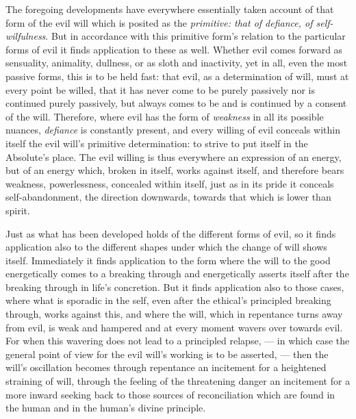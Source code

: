 \documentclass[12pt,a4paper]{book}
\begin{document}
The foregoing developments have everywhere essentially taken account of that
form of the evil will which is posited as the \emph{primitive: that of defiance,
of self-wilfulness}. But in accordance with this primitive form's relation to
the particular forms of evil it finds application to these as well. Whether evil
comes forward as sensuality, animality, dullness, or as sloth and inactivity,
yet in all, even the most passive forms, this is to be held fast: that evil, as
a determination of will, must at every point be willed, that it has never come
to be purely passively nor is continued purely passively, but always comes to be
and is continued by a consent of the will. Therefore, where evil has the form of
\emph{weakness} in all its possible nuances, \emph{defiance} is constantly
present, and every willing of evil conceals within itself the evil will's
primitive determination: to strive to put itself in the Absolute's place. The
evil willing is thus everywhere an expression of an energy, but of an energy
which, broken in itself, works against itself, and therefore bears weakness,
powerlessness, concealed within itself, just as in its pride it conceals
self-abandonment, the direction downwards, towards that which is lower than
spirit.

Just as what has been developed holds of the different forms of evil, so it
finds application also to the different shapes under which the change of will
shows itself. Immediately it finds application to the form where the will to the
good energetically comes to a breaking through and energetically asserts itself
after the breaking through in life's concretion. But it finds application also
to those cases,
where what is sporadic in the self, even after the ethical's principled breaking
through, works against this, and where the will, which in repentance turns away
from evil, is weak and hampered and at every moment wavers over towards evil.
For when this wavering does not lead to a principled relapse, --- in which case
the general point of view for the evil will's working is to be asserted, ---
then the will's oscillation becomes through repentance an incitement for a
heightened straining of will, through the feeling of the threatening danger an
incitement for a more inward seeking back to those sources of reconciliation
which are found in the human and in the human's divine principle.
\end{document}
